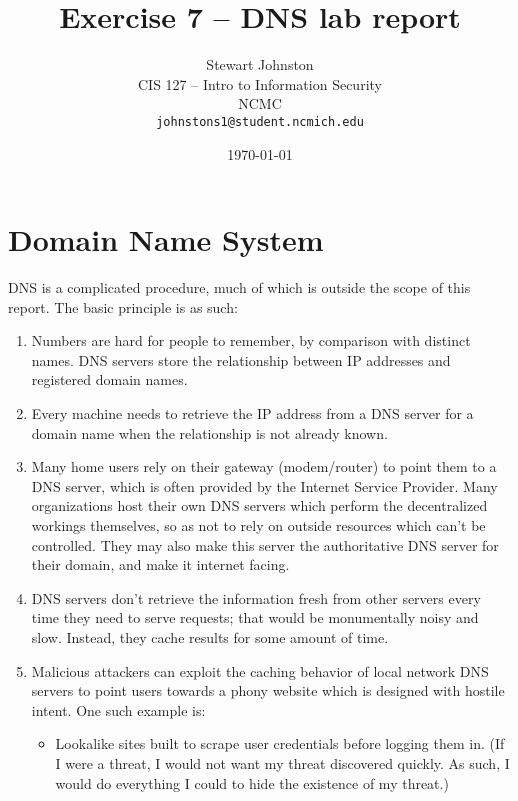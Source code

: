 \documentclass{article}
\title{Exercise 7 -- DNS lab report}
\author{Stewart Johnston\\
  {CIS 127 -- Intro to Information Security}\\
  {NCMC}\\
  {\texttt{johnstons1@student.ncmich.edu}}
}
\date{\today}
\begin{document}
\maketitle

\section{Domain Name System}
DNS is a complicated procedure, much of which is outside the scope of this
report. The basic principle is as such:

\begin{enumerate}
	\item Numbers are hard for people to remember, by comparison with
		distinct names. DNS servers store the relationship between IP
		addresses and registered domain names.
	\item Every machine needs to retrieve the IP address from a
		DNS server for a domain name when the relationship is not
		already known.
	\item Many home users rely on their gateway (modem/router) to point
		them to a DNS server, which is often provided by the Internet
		Service Provider. Many organizations host their own DNS servers
		which perform the decentralized workings themselves, so as not
		to rely on outside resources which can't be controlled. They
		may also make this server the authoritative DNS server for
		their domain, and make it internet facing.
	\item DNS servers don't retrieve the information fresh from other
		servers every time they need to serve requests; that would be
		monumentally noisy and slow. Instead, they cache results for
		some amount of time.
	\item Malicious attackers can exploit the caching behavior of local
		network DNS servers to point users towards a phony website
		which is designed with hostile intent. One such example is:
		\begin{itemize}
			\item Lookalike sites built to scrape user credentials
				before logging them in. (If I were a threat, I
				would not want my threat discovered quickly. As
				such, I would do everything I could to hide the
				existence of my threat.)
		\end{itemize}
\end{enumerate}
\end{document}
